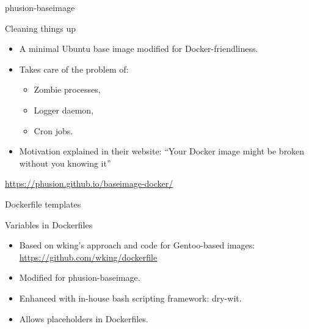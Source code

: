 \documentclass[presentation]{beamer}
\begin{document}
{
\begin{frame}[label=sec-7-5]{phusion-baseimage}

\begin{block}{Cleaning things up}

\begin{itemize}
\item A minimal Ubuntu base image modified for Docker-friendliness.
\item Takes care of the problem of:
\begin{itemize}
\item Zombie processes,
\item Logger daemon,
\item Cron jobs.
\end{itemize}
\item Motivation explained in their website: ``Your Docker image might be broken without you knowing it''
\end{itemize}
\url{https://phusion.github.io/baseimage-docker/}
\end{block}
\end{frame}
} %

{
\begin{frame}[label=sec-7-6]{Dockerfile templates}

\begin{block}{Variables in Dockerfiles}

\begin{itemize}
\item Based on wking's approach and code for Gentoo-based images:
\url{https://github.com/wking/dockerfile}
\item Modified for phusion-baseimage.
\item Enhanced with in-house bash scripting framework: dry-wit.
\item Allows placeholders in Dockerfiles.
\end{itemize}
\end{block}
\end{frame}
} %
\end{document}
